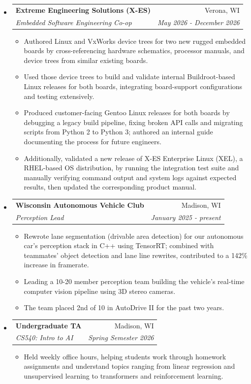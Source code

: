 \documentclass[letterpaper,11pt]{article}
\makeatletter
\newcommand{\resitem}[1]{\item #1 \vspace{-2pt}}
\newcommand{\resheading}[1]{\vspace{6pt}{\large \colorbox{mygrey}{\begin{minipage}{\textwidth}{\textbf{#1 \vphantom{p\^{E}}}}\end{minipage}}}}
\newcommand{\ressubheading}[4]{
  \begin{tabular*}{7.0in}{l@{\extracolsep{\fill}}r}
    \textbf{#1} & #2 \\
    \textit{#3} & \textit{#4} \\
  \end{tabular*}\vspace{3pt}}
\makeatother
\begin{document}
\resheading{Relevant Experience}
\begin{itemize}

\item
  \ressubheading{Extreme Engineering Solutions (X-ES)}{Verona, WI}{Embedded Software Engineering Co-op}{May 2026 - December 2026}
  \begin{itemize}
    \resitem{Authored Linux and VxWorks device trees for two new rugged embedded boards by cross-referencing hardware schematics, processor manuals, and device trees from similar existing boards.}
    \resitem{Used those device trees to build and validate internal Buildroot-based Linux releases for both boards, integrating board-support configurations and testing extensively.}
    \resitem{Produced customer-facing Gentoo Linux releases for both boards by debugging a legacy build pipeline, fixing broken API calls and migrating scripts from Python 2 to Python 3; authored an internal guide documenting the process for future engineers.}
    \resitem{Additionally, validated a new release of X-ES Enterprise Linux (XEL), a RHEL-based OS distribution, by running the integration test suite and manually verifying command output and system logs against expected results, then updated the corresponding product manual.}
  \end{itemize}

\item
  \ressubheading{Wisconsin Autonomous Vehicle Club}{Madison, WI}{Perception Lead}{January 2025 - present}
  \begin{itemize}
    \resitem{Rewrote lane segmentation (drivable area detection) for our autonomous car's perception stack in C++ using TensorRT; combined with teammates' object detection and lane line rewrites, contributed to a 142\% increase in framerate.}
    \resitem{Leading a 10-20 member perception team building the vehicle's real-time computer vision pipeline using 3D stereo cameras.}
    \resitem{The team placed 2nd of 10 in AutoDrive II for the past two years.}
  \end{itemize}

\item
  \ressubheading{Undergraduate TA}{Madison, WI}{CS540: Intro to AI}{Spring Semester 2026}
  \begin{itemize}
    \resitem{Held weekly office hours, helping students work through homework assignments and understand topics ranging from linear regression and unsupervised learning to transformers and reinforcement learning.}
  \end{itemize}


\end{itemize}
\end{document}
